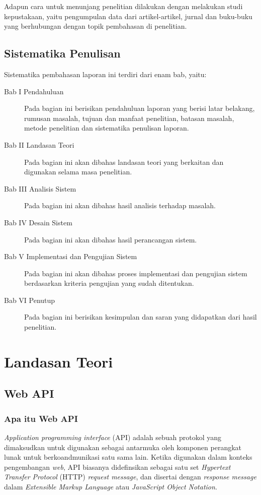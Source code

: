 \documentclass[a4paper, 12pt]{report}
\begin{document}
\onehalfspacing Adapun cara untuk menunjang penelitian dilakukan dengan melakukan studi kepustakaan, yaitu pengumpulan data dari artikel-artikel, jurnal dan buku-buku yang berhubungan dengan topik pembahasan di penelitian.

\section{Sistematika Penulisan}
Sistematika pembahasan laporan ini terdiri dari enam bab, yaitu:
\begin{description}
  \item[Bab I Pendahuluan] Pada bagian ini berisikan pendahuluan laporan yang berisi latar belakang, rumusan masalah, tujuan dan manfaat penelitian, batasan masalah, metode penelitian dan sistematika penulisan laporan.
  \item[Bab II Landasan Teori] Pada bagian ini akan dibahas landasan teori yang berkaitan dan digunakan selama masa penelitian.
  \item[Bab III Analisis Sistem] Pada bagian ini akan dibahas hasil analisis terhadap masalah.
  \item[Bab IV Desain Sistem] Pada bagian ini akan dibahas hasil perancangan sistem.
  \item[Bab V Implementasi dan Pengujian Sistem] Pada bagian ini akan dibahas proses implementasi dan pengujian sistem berdasarkan kriteria pengujian yang sudah ditentukan.
  \item[Bab VI Penutup] Pada bagian ini berisikan kesimpulan dan saran yang didapatkan dari hasil penelitian.
\end{description}

\chapter{Landasan Teori}

\section{Web API}
\onehalfspacing
\subsection{Apa itu Web API}

\onehalfspacing \textit{Application programming interface} (API) adalah sebuah protokol yang dimaksudkan untuk digunakan sebagai antarmuka oleh komponen perangkat lunak untuk berkoandmunikasi satu sama lain. Ketika digunakan dalam konteks pengembangan \textit{web}, API biasanya didefinsikan sebagai satu set \textit{Hypertext Transfer Protocol} (HTTP) \textit{request message}, dan disertai dengan \textit{response message} dalam \textit{Extensible Markup Language} atau \textit{JavaScript Object Notation}.
\end{document}
